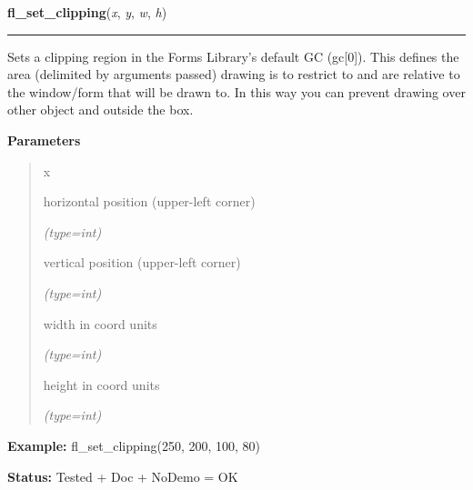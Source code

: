 \hspace{.8\funcindent}\begin{boxedminipage}{\funcwidth}

    \raggedright \textbf{fl\_set\_clipping}(\textit{x}, \textit{y}, \textit{w}, \textit{h})

    \vspace{-1.5ex}

    \rule{\textwidth}{0.5\fboxrule}
\setlength{\parskip}{2ex}
    Sets a clipping region in the Forms Library's default GC (gc[0]). This 
    defines the area (delimited by arguments passed) drawing is to restrict
    to and are relative to the window/form that will be drawn to. In this 
    way you can prevent drawing over other object and outside the box.

\setlength{\parskip}{1ex}
      \textbf{Parameters}
      \vspace{-1ex}

      \begin{quote}
        \begin{Ventry}{x}

          \item[x]

          horizontal position (upper-left corner)

            {\it (type=int)}

          \item[y]

          vertical position (upper-left corner)

            {\it (type=int)}

          \item[w]

          width in coord units

            {\it (type=int)}

          \item[h]

          height in coord units

            {\it (type=int)}

        \end{Ventry}

      \end{quote}

\textbf{Example:} fl\_set\_clipping(250, 200, 100, 80)



\textbf{Status:} Tested + Doc + NoDemo = OK



    \end{boxedminipage}

